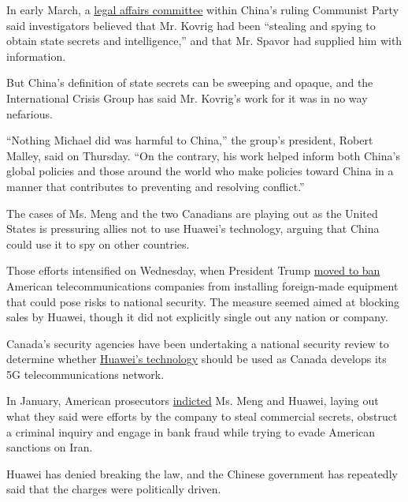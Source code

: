 In early March, a
\href{https://www.nytimes.com/2019/03/04/world/asia/china-canada-michael-kovrig-huawei.html}{legal
affairs committee} within China's ruling Communist Party said
investigators believed that Mr. Kovrig had been ``stealing and spying to
obtain state secrets and intelligence,'' and that Mr. Spavor had
supplied him with information.

But China's definition of state secrets can be sweeping and opaque, and
the International Crisis Group has said Mr. Kovrig's work for it was in
no way nefarious.

``Nothing Michael did was harmful to China,'' the group's president,
Robert Malley, said on Thursday. ``On the contrary, his work helped
inform both China's global policies and those around the world who make
policies toward China in a manner that contributes to preventing and
resolving conflict.''

The cases of Ms. Meng and the two Canadians are playing out as the
United States is pressuring allies not to use Huawei's technology,
arguing that China could use it to spy on other countries.

Those efforts intensified on Wednesday, when President Trump
\href{https://www.nytimes.com/2019/05/15/business/huawei-ban-trump.html?rref=collection\%2Ftimestopic\%2FChina\&action=click\&contentCollection=world\&region=stream\&module=stream_unit\&version=latest\&contentPlacement=1\&pgtype=collection}{moved
to ban} American telecommunications companies from installing
foreign-made equipment that could pose risks to national security. The
measure seemed aimed at blocking sales by Huawei, though it did not
explicitly single out any nation or company.

Canada's security agencies have been undertaking a national security
review to determine whether
\href{https://www.nytimes.com/2019/02/27/world/canada/huawei-5g-meng-wanzhou-china.html}{Huawei's
technology} should be used as Canada develops its 5G telecommunications
network.

In January, American prosecutors
\href{https://www.nytimes.com/2019/01/28/us/politics/meng-wanzhou-huawei-iran.html?module=inline}{indicted}
Ms. Meng and Huawei, laying out what they said were efforts by the
company to steal commercial secrets, obstruct a criminal inquiry and
engage in bank fraud while trying to evade American sanctions on Iran.

Huawei has denied breaking the law, and the Chinese government has
repeatedly said that the charges were politically driven.

